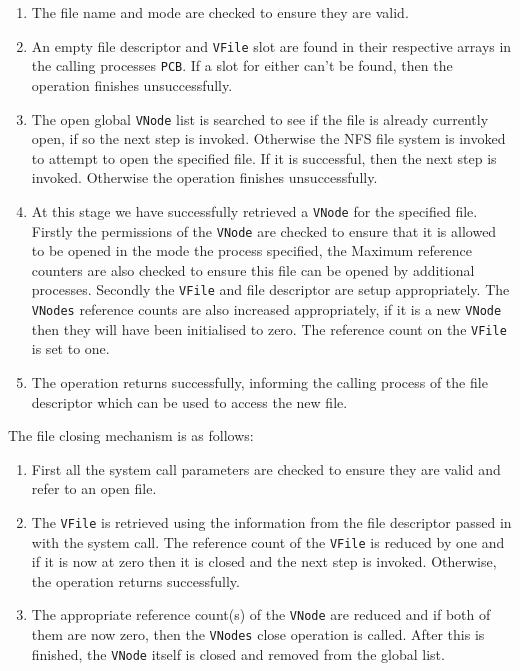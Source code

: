 \documentclass[12pt,english]{article}
\begin{document}
\begin{enumerate}
\item The file name and mode are checked to ensure they are valid.
\item An empty file descriptor and \texttt{VFile} slot are found in their respective arrays in the calling processes \texttt{PCB}. If a slot for either can't be found, then the operation finishes unsuccessfully.
\item The open global \texttt{VNode} list is searched to see if the file is already currently open, if so the next step is invoked. Otherwise the NFS file system is invoked to attempt to open the specified file. If it is successful, then the next step is invoked. Otherwise the operation finishes unsuccessfully.
\item At this stage we have successfully retrieved a \texttt{VNode} for the specified file. Firstly the permissions of the \texttt{VNode} are checked to ensure that it is allowed to be opened in the mode the process specified, the Maximum reference counters are also checked to ensure this file can be opened by additional processes. Secondly the \texttt{VFile} and file descriptor are setup appropriately. The \texttt{VNodes} reference counts are also increased appropriately, if it is a new \texttt{VNode} then they will have been initialised to zero. The reference count on the \texttt{VFile} is set to one.
\item The operation returns successfully, informing the calling process of the file descriptor which can be used to access the new file.
\end{enumerate}

The file closing mechanism is as follows:

\begin{enumerate}
\item First all the system call parameters are checked to ensure they are valid and refer to an open file.
\item The \texttt{VFile} is retrieved using the information from the file descriptor passed in with the system call. The reference count of the \texttt{VFile} is reduced by one and if it is now at zero then it is closed and the next step is invoked. Otherwise, the operation returns successfully.
\item The appropriate reference count(s) of the \texttt{VNode} are reduced and if both of them are now zero, then the \texttt{VNodes} close operation is called. After this is finished, the \texttt{VNode} itself is closed and removed from the global list.
\end{enumerate}
\end{document}
